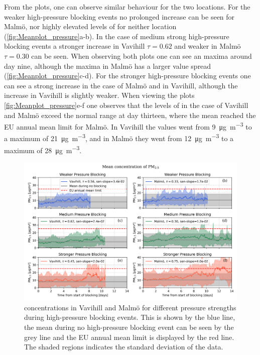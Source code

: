 From the plots, one can observe similar behaviour for the two locations. For the weaker high-pressure blocking events no prolonged increase can be seen for Malmö, nor highly elevated levels of \PM for neither location (\autoref{fig:Meanplot_pressure}a-b). In the case of medium strong high-pressure blocking events a stronger increase in Vavihill $\tau=0.62$ and weaker in Malmö $\tau=0.30$ can be seen. When observing both plots one can see an maxima around day nine, although the maxima in Malmö has a larger value spread (\autoref{fig:Meanplot_pressure}c-d). For the stronger high-pressure blocking events one can see a strong increase in the case of Malmö and in Vavihill, although the increase in Vavihill is slightly weaker. When viewing the plots \autoref{fig:Meanplot_pressure}e-f one observes that the levels of \PM in the case of Vavihill and Malmö exceed the normal range at day thirteen, where the mean reached the EU annual mean limit for Malmö. In Vavihill the values went from \SI{9}{\micro\gram\per\meter\cubed} to a maximum of \SI{21}{\micro\gram\per\meter\cubed}, and in Malmö they went from \SI{12}{\micro\gram\per\meter\cubed} to a maximum of \SI{28}{\micro\gram\per\meter\cubed}. 


\begin{figure}[H]
        \centering
        \includegraphics[width=\textwidth]{Figures/Meanplot_pressure.png}
        \caption{\PM concentrations in Vavihill and Malmö for different pressure strengths during high-pressure blocking events. This is shown by the blue line, the mean during no high-pressure blocking event can be seen by the grey line and the EU annual mean limit is displayed by the red line. The shaded regions indicates the standard deviation of the data.}
        \label{fig:Meanplot_pressure}
\end{figure}
 

